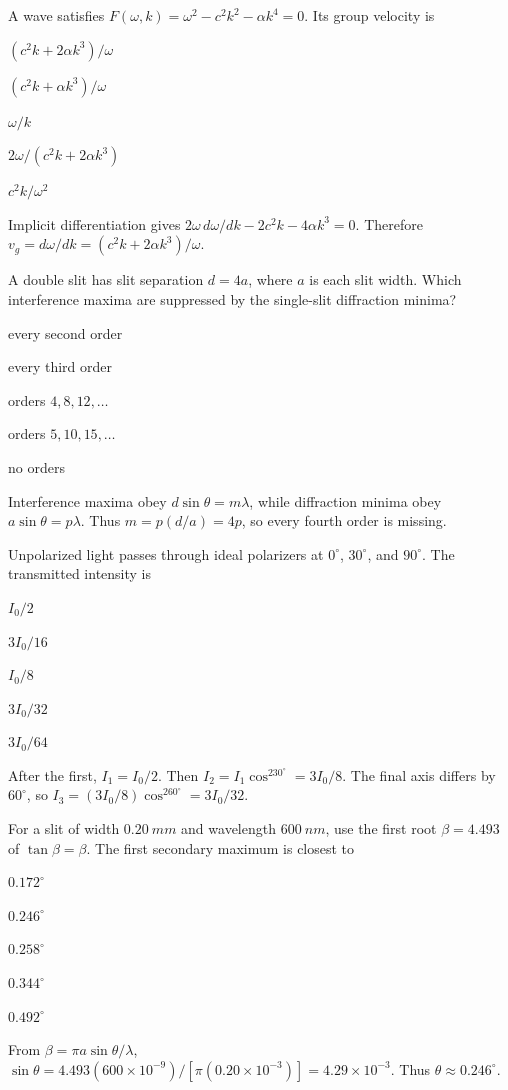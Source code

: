 \documentclass[10pt,a4paper,full]{physicsquiz}
\newcommand{\bankq}[9]{%
  \begin{quizquestion}[
    id=#1,
    topic={#2},
    difficulty=#3,
    marks=1,
    correct=#4,
    tags={#5},
    outcome={#6}
  ]
    #7
    \begin{choiceoptions}
      #8
    \end{choiceoptions}
  \end{quizquestion}
  \begin{quizsolution}
    #9
  \end{quizsolution}
}
\begin{document}
\begin{quizbank}
\bankq{phenomena-067}{Interference, Diffraction, Dispersion, and Polarization}{challenge}{A}{dispersion,implicit-differentiation}{Differentiate an implicit dispersion relation.}{%
A wave satisfies \(F(\omega,k)=\omega^2-c^2k^2-\alpha k^4=0\). Its group velocity is}{%
\item \((c^2k+2\alpha k^3)/\omega\)
\item \((c^2k+\alpha k^3)/\omega\)
\item \(\omega/k\)
\item \(2\omega/(c^2k+2\alpha k^3)\)
\item \(c^2k/\omega^2\)}{%
Implicit differentiation gives \(2\omega\,d\omega/dk-2c^2k-4\alpha k^3=0\). Therefore \(v_g=d\omega/dk=(c^2k+2\alpha k^3)/\omega\).}

\bankq{phenomena-068}{Interference, Diffraction, Dispersion, and Polarization}{challenge}{C}{interference,diffraction,missing-orders}{Determine missing double-slit orders.}{%
A double slit has slit separation \(d=4a\), where \(a\) is each slit width. Which interference maxima are suppressed by the single-slit diffraction minima?}{%
\item every second order
\item every third order
\item orders \(4,8,12,\ldots\)
\item orders \(5,10,15,\ldots\)
\item no orders}{%
Interference maxima obey \(d\sin\theta=m\lambda\), while diffraction minima obey \(a\sin\theta=p\lambda\). Thus \(m=p(d/a)=4p\), so every fourth order is missing.}

\bankq{phenomena-069}{Interference, Diffraction, Dispersion, and Polarization}{challenge}{D}{polarization,multiple-polarizers}{Analyze three successive polarizers.}{%
Unpolarized light passes through ideal polarizers at \(0^\circ\), \(30^\circ\), and \(90^\circ\). The transmitted intensity is}{%
\item \(I_0/2\)
\item \(3I_0/16\)
\item \(I_0/8\)
\item \(3I_0/32\)
\item \(3I_0/64\)}{%
After the first, \(I_1=I_0/2\). Then \(I_2=I_1\cos^230^\circ=3I_0/8\). The final axis differs by \(60^\circ\), so \(I_3=(3I_0/8)\cos^260^\circ=3I_0/32\).}

\bankq{phenomena-070}{Interference, Diffraction, Dispersion, and Polarization}{challenge}{B}{diffraction,secondary-maximum}{Use the exact single-slit secondary-maximum condition.}{%
For a slit of width \(\SI{0.20}{mm}\) and wavelength \(\SI{600}{nm}\), use the first root \(\beta=4.493\) of \(\tan\beta=\beta\). The first secondary maximum is closest to}{%
\item \(0.172^\circ\)
\item \(0.246^\circ\)
\item \(0.258^\circ\)
\item \(0.344^\circ\)
\item \(0.492^\circ\)}{%
From \(\beta=\pi a\sin\theta/\lambda\), \(\sin\theta=4.493(600\times10^{-9})/[\pi(0.20\times10^{-3})]=4.29\times10^{-3}\). Thus \(\theta\approx0.246^\circ\).}


\end{quizbank}
\end{document}
